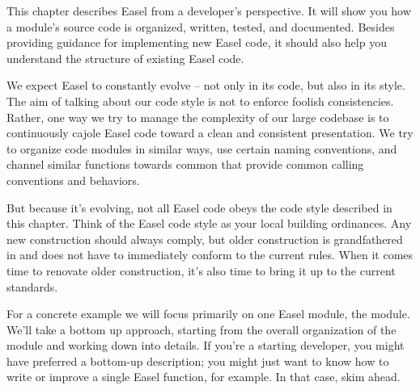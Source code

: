 
This chapter describes Easel from a developer's perspective. It will
show you how a module's source code is organized, written, tested, and
documented. Besides providing guidance for implementing new Easel
code, it should also help you understand the structure of existing
Easel code.

We expect Easel to constantly evolve -- not only in its code, but also
in its style. The aim of talking about our code style is not to
enforce foolish consistencies. Rather, one way we try to manage the
complexity of our large codebase is to continuously cajole Easel code
toward a clean and consistent presentation. We try to organize code
modules in similar ways, use certain naming conventions, and channel
similar functions towards common  that provide
common calling conventions and behaviors.

But because it's evolving, not all Easel code obeys the code style
described in this chapter. Think of the Easel code style as your local
building ordinances. Any new construction should always comply, but
older construction is grandfathered in and does not have to
immediately conform to the current rules. When it comes time to
renovate older construction, it's also time to bring it up to the
current standards.

For a concrete example we will focus primarily on one Easel module,
the  module. We'll take a bottom up approach, starting
from the overall organization of the module and working down into
details. If you're a starting developer, you might have preferred a
bottom-up description; you might just want to know how to write or
improve a single Easel function, for example. In that case, skim
ahead.

